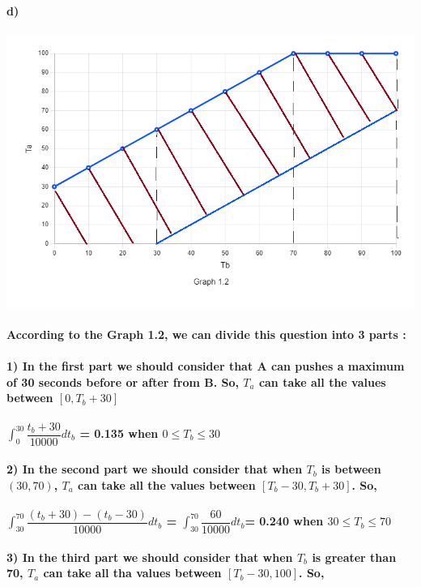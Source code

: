 \documentclass[12pt]{article}
\begin{document}
\paragraph{d) 
\\\\ {\hspace*{100}}\includegraphics[scale=0.5]{Graph 1.2}
\\\\ According to the Graph 1.2,  we can divide this question into 3 parts :
\\\\ 1) In the first part we should consider that A can pushes a maximum of 30 seconds before or after from B. So, $T_{a}$ can take all the values between $[0,T_{b}+30]$ 
\\\\ {\hspace*{50}} \(\int_{0}^{30} \dfrac{t_{b} + 30}{10000} dt_{b}\) = 0.135  {\hspace*{30}} when {\hspace*{10}} 
$0\leq T_{b} \leq 30$
\\\\ 2) In the second part we should consider that when $T_{b}$ is between $(30,70)$, $T_{a}$ can take all the values between $[T_{b}-30, T_{b}+30]$. So,
\\\\ {\hspace*{50}} \(\int_{30}^{70} \dfrac{(t_{b} + 30) - (t_{b} - 30)}{10000} dt_{b}\) = \(\int_{30}^{70} \dfrac{60}{10000} dt_{b}\)= 0.240  {\hspace*{30}} when {\hspace*{10}}$30\leq T_{b} \leq 70$
\\\\ 3) In the third part we should consider that when $T_{b}$ is greater than 70, $T_{a}$ can take all tha values between $[T_{b}-30, 100]$. So,
}
\end{document}
